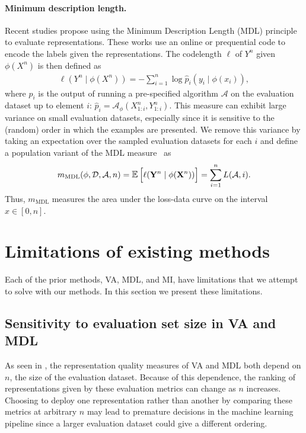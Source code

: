 \paragraph{Minimum description length.}
Recent studies \citep{Yogatama2019LinguisticIntel,Voita2020InformationTheoreticPW} propose using the Minimum Description Length (MDL) principle \citep{Rissanen1978ModelingBS,Grnwald2004ATI} to evaluate representations.
These works use an online or prequential code \citep{Blier2018TheDL} to encode the labels given the representations. The codelength $ \ell$ of $ Y^n $ given $ \phi(X^n) $ is then defined as
\begin{align}
    \ell(Y^n \mid \phi(X^n)) = - \sum_{i=1}^n \log \hat{p}_i(y_{i} \mid \phi(x_{i})),
\end{align}
where $\hat{p}_i$ is the output of running a pre-specified algorithm $\mathcal{A}$ on the evaluation dataset up to element $i$: $\hat{p}_i = \mathcal{A}_\phi(X^n_{1:i}, Y^n_{1:i})$.
This measure can exhibit large variance on small evaluation datasets, especially since it is sensitive to the (random) order in which the examples are presented.
We remove this variance by taking an expectation over the sampled evaluation datasets for each $i$ and define a population variant of the MDL measure~\citep{Voita2020InformationTheoreticPW} as
\begin{align} \label{eq:mdl_expected}
    m_{\mathrm{MDL}}(\phi, \mathcal{D}, \mathcal{A},n) = \E \Big[ \ell(\rmY^n \mid \phi(\rmX^n)) \Big] = \sum_{i=1}^n L(\mathcal{A}, i).
\end{align}
Thus, $m_\mathrm{MDL}$ measures the area under the loss-data curve on the interval $x \in [0, n]$.

\section{Limitations of existing methods}

Each of the prior methods, VA, MDL, and MI, have limitations that we attempt to solve with our methods. In this section we present these limitations.

\subsection{Sensitivity to evaluation set size in VA and MDL}
As seen in , the representation quality measures of VA and MDL
both depend on $n$, the size of the evaluation dataset.
Because of this dependence, the ranking of representations given by these evaluation metrics can change as $n$ increases.
Choosing to deploy one representation rather than another by comparing these metrics at arbitrary $n$ may lead to premature decisions in the machine learning pipeline since a larger  evaluation dataset could give a different ordering.


